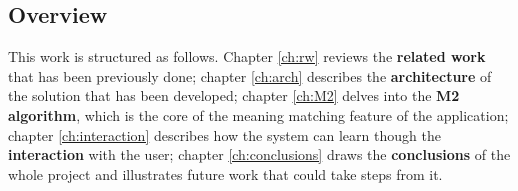 \subsection{Overview}

This work is structured as follows. Chapter \ref{ch:rw} reviews the \textbf{related work} that has been previously done; chapter \ref{ch:arch} describes the \textbf{architecture} of the solution that has been developed; chapter \ref{ch:M2} delves into the \textbf{M2 algorithm}, which is the core of the meaning matching feature of the application; chapter \ref{ch:interaction} describes how the system can learn though the \textbf{interaction} with the user; chapter \ref{ch:conclusions} draws the \textbf{conclusions} of the whole project and illustrates future work that could take steps from it.

